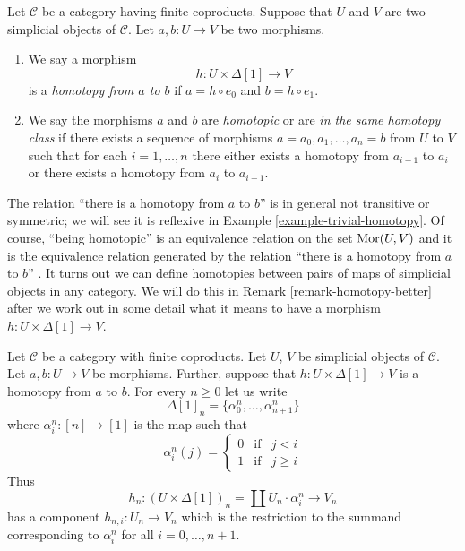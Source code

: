 \begin{definition}
\label{definition-homotopy}
Let $\mathcal{C}$ be a category having finite coproducts.
Suppose that $U$ and $V$ are two simplicial objects of $\mathcal{C}$.
Let $a, b : U \to V$ be two morphisms.
\begin{enumerate}
\item We say a morphism
$$
h : U \times \Delta[1] \longrightarrow V
$$
is a {\it homotopy from $a$ to $b$} if $a = h \circ e_0$ and
$b = h \circ e_1$.
\item We say the morphisms $a$ and $b$ are {\it homotopic} or are
{\it in the same homotopy class}
if there exists a sequence of morphisms $a = a_0, a_1, \ldots, a_n = b$
from $U$ to $V$ such that for each $i = 1, \ldots, n$ there either exists
a homotopy from $a_{i - 1}$ to $a_i$ or there exists a homotopy
from $a_i$ to $a_{i - 1}$.
\end{enumerate}
\end{definition}

\noindent
The relation ``there is a homotopy from $a$ to $b$'' is in general not
transitive or symmetric; we will see it is reflexive in
Example \ref{example-trivial-homotopy}. Of course, ``being homotopic''
is an equivalence relation on the set $\mathop{\mathrm{Mor}}\nolimits(U, V)$ and it is the
equivalence relation generated by the relation
``there is a homotopy from $a$ to $b$'' .
It turns out we can define homotopies between pairs of maps of simplicial
objects in any category. We will do this in Remark \ref{remark-homotopy-better}
after we work out in some detail what it means to have a morphism
$h : U \times \Delta[1] \to V$.

\medskip\noindent
Let $\mathcal{C}$ be a category with finite coproducts.
Let $U$, $V$ be simplicial objects of $\mathcal{C}$.
Let $a, b : U \to V$ be morphisms. Further, suppose
that $h : U \times \Delta[1] \to V$ is a homotopy
from $a$ to $b$. For every $n \geq 0$
let us write
$$
\Delta[1]_n = \{\alpha^n_0, \ldots, \alpha^n_{n + 1}\}
$$
where $\alpha^n_i : [n] \to [1]$ is the map
such that
$$
\alpha^n_i(j)
=
\left\{
\begin{matrix}
0 & \text{if} & j < i\\
1 & \text{if} & j \geq i
\end{matrix}
\right.
$$
Thus
$$
h_n : (U \times \Delta[1])_n = \coprod U_n \cdot \alpha^n_i
\longrightarrow
V_n
$$
has a component $h_{n, i} : U_n \to V_n$ which is the restriction
to the summand corresponding to $\alpha^n_i$ for all $i = 0, \ldots, n + 1$.

